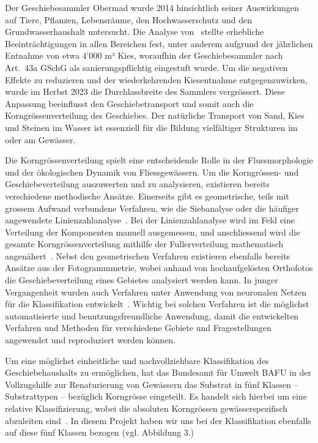 \documentclass[12pt]{article}
\begin{document}
    Der Geschiebesammler Obermad wurde 2014 hinsichtlich seiner Auswirkungen auf Tiere, Pflanzen, Lebensräume, den Hochwasserschutz und den Grundwasserhaushalt untersucht.
    Die Analyse von~\cite{hunzingerGewaesserentwicklungskonzeptBernGEKOBE2014} stellte erhebliche Beeinträchtigungen in allen Bereichen fest, unter anderem aufgrund der jährlichen Entnahme von etwa 4'000 m³ Kies, woraufhin der Geschiebesammler nach Art.\ 43a GSchG als sanierungspflichtig eingestuft wurde.
    Um die negativen Effekte zu reduzieren und der wiederkehrenden Kiesentnahme entgegenzuwirken, wurde im Herbst 2023 die Durchlassbreite des Sammlers vergrössert.
    Diese Anpassung beeinflusst den Geschiebetransport und somit auch die Korngrössenverteilung des Geschiebes.
    Der natürliche Transport von Sand, Kies und Steinen im Wasser ist essenziell für die Bildung vielfältiger Strukturen im oder am Gewässer.

    Die Korngrössenverteilung spielt eine entscheidende Rolle in der Flussmorphologie und der ökologischen Dynamik von Fliessgewässern.
    Um die Korngrössen- und Geschiebeverteilung auszuwerten und zu analysieren, existieren bereits verschiedene methodische Ansätze.
    Einerseits gibt es geometrische, teils mit grossem Aufwand verbundene Verfahren, wie die Siebanalyse oder die häufiger angewendete Linienzahlanalyse~\parencite{fehrGeschiebeanalysenGebirgsflussenUmrechnung1987}.
    Bei der Linienzahlanalyse wird im Feld eine Verteilung der Komponenten manuell ausgemessen, und anschliessend wird die gesamte Korngrössenverteilung mithilfe der Fullerverteilung mathematisch angenähert~\parencite{fehrEinfacheBestimmungKorngroessenverteilung1987}.
    Nebst den geometrischen Verfahren existieren ebenfalls bereits Ansätze aus der Fotogrammmetrie, wobei anhand von hochaufgelösten Orthofotos die Geschiebeverteilung eines Gebietes analysiert werden kann.
    In junger Vergangenheit wurden auch Verfahren unter Anwendung von neuronalen Netzen für die Klassifikation entwickelt~\parencite[vgl.]{keuschSubstratkartierungAlpinenOekosystemen2023}.
    Wichtig bei solchen Verfahren ist die möglichst automatisierte und benutzungsfreundliche Anwendung, damit die entwickelten Verfahren und Methoden für verschiedene Gebiete und Fragestellungen angewendet und reproduziert werden können.

    Um eine möglichst einheitliche und nachvollziehbare Klassifikation des Geschiebehaushalts zu ermöglichen, hat das Bundesamt für Umwelt BAFU in der Vollzugshilfe zur Renaturierung von Gewässern das Substrat in fünf Klassen – Substrattypen – bezüglich Korngrösse eingeteilt.
    Es handelt sich hierbei um eine relative Klassifizierung, wobei die absoluten Korngrössen gewässerspezifisch abzuleiten sind~\parencite{nitscheGeschiebehaushaltMassnahmen2024}.
    In diesem Projekt haben wir uns bei der Klassifikation ebenfalls auf diese fünf Klassen bezogen (vgl. Abbildung 3.) %
\end{document}
